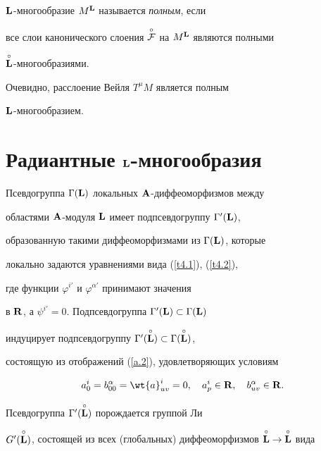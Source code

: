 \begin{defn}


${\bold L}$-многообразие $M^{\bold L}$ называется {\it полным}, если


все слои канонического слоения $\overset{\circ}{\cal F}{}$ на $M^{\bold L}$ являются полными


$\overset{\circ}{\bold L}{}$-многообразиями.


\end{defn}





Очевидно, расслоение Вейля $T^\mu M$ является полным


${\bold L}$-многообразием.








\section{Радиантные ${\bold L}$-многообразия}





Псевдогруппа $\Gamma({\bold L})$ локальных ${\bold A}$-диффеоморфизмов между


областями ${\bold A}$-модуля ${\bold L}$ имеет подпсевдогруппу $\Gamma'({\bold L})$,


образованную такими диффеоморфизмами из $\Gamma({\bold L})$, которые


локально задаются уравнениями вида (\ref{t4.1}), (\ref{t4.2}),


где функции $\varphi^{i'}$ и $\varphi^{\alpha'}$ принимают значения


в ${\bold R}$, а $\psi^{i'}{=}0$. Подпсевдогруппа $\Gamma'({\bold L})\subset\Gamma({\bold L})$


индуцирует подпсевдогруппу $\Gamma'(\overset{\circ}{\bold L}{})\subset\Gamma(\overset{\circ}{\bold L}{})$,


состоящую из отображений (\ref{a.2}), удовлетворяющих условиям


\begin{equation}


\label{sub}


a^i_0=b^\alpha_{00}={\wt{a}}^i_{uv}=0, \quad


a^i_p\in\R, \quad b^\alpha_{uv}\in\R.


\end{equation}


Псевдогруппа $\Gamma'(\overset{\circ}{\bold L}{})$ порождается группой Ли


$G'(\overset{\circ}{\bold L}{})$, состоящей из всех (глобальных) диффеоморфизмов $\overset{\circ}{\bold L}{}\to\overset{\circ}{\bold L}{}$ вида


